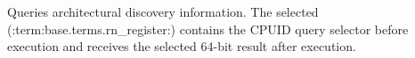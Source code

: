 Queries architectural discovery information. The selected (:term:base.terms.rn_register:) contains the CPUID query selector before execution and receives the selected 64-bit result after execution.
